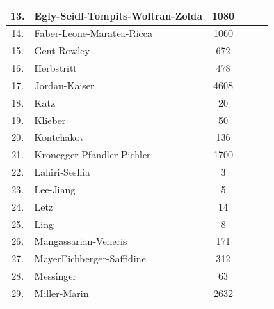 \documentclass[runningheads]{llncs}
\begin{document}
\begin{table}
\begin{tabular}{c|l|c|c|c|c}
13. & Egly-Seidl-Tompits-Woltran-Zolda &  1080 &  &  &  \\ \hline

14. & Faber-Leone-Maratea-Ricca &  1060 &  &  &  \\ \hline 

15. & Gent-Rowley &  672 &  &  &  \\ \hline

16. & Herbstritt &  478 & &  &  \\ \hline

17. & Jordan-Kaiser &  4608 & &  &  \\\hline

18. & Katz &  20 &  &  &  \\ \hline

19. & Klieber & 50 &  &  &  \\ \hline

20. & Kontchakov&  136 & &  &  \\ \hline

21. & Kronegger-Pfandler-Pichler &  1700 &  &   & \\ \hline 

22. & Lahiri-Seshia & 3 & &  &  \\ \hline

23. & Lee-Jiang &  5 &  &  &  \\ \hline

24. & Letz & 14 &  &  &  \\\hline

25. & Ling &  8 & &  &  \\ \hline

26. & Mangassarian-Veneris &  171 & &  &  \\ \hline

27. & MayerEichberger-Saffidine &  312 & & & \\\hline

28. & Messinger &  63 & &  &  \\ \hline

29. & Miller-Marin & 2632 & &  &  \\ \hline


\end{tabular}
\end{table}
\end{document}
